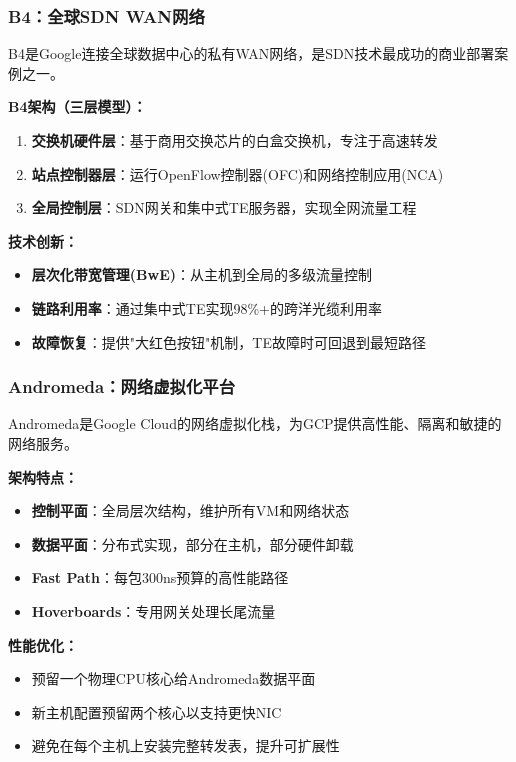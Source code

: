 \subsubsection{B4：全球SDN WAN网络}

B4是Google连接全球数据中心的私有WAN网络，是SDN技术最成功的商业部署案例之一。

\textbf{B4架构（三层模型）：}

\begin{enumerate}
    \item \textbf{交换机硬件层}：基于商用交换芯片的白盒交换机，专注于高速转发
    \item \textbf{站点控制器层}：运行OpenFlow控制器(OFC)和网络控制应用(NCA)
    \item \textbf{全局控制层}：SDN网关和集中式TE服务器，实现全网流量工程
\end{enumerate}

\textbf{技术创新：}
\begin{itemize}
    \item \textbf{层次化带宽管理(BwE)}：从主机到全局的多级流量控制
    \item \textbf{链路利用率}：通过集中式TE实现98\%+的跨洋光缆利用率
    \item \textbf{故障恢复}：提供"大红色按钮"机制，TE故障时可回退到最短路径
\end{itemize}

\subsubsection{Andromeda：网络虚拟化平台}

Andromeda是Google Cloud的网络虚拟化栈，为GCP提供高性能、隔离和敏捷的网络服务。

\textbf{架构特点：}
\begin{itemize}
    \item \textbf{控制平面}：全局层次结构，维护所有VM和网络状态
    \item \textbf{数据平面}：分布式实现，部分在主机，部分硬件卸载
    \item \textbf{Fast Path}：每包300ns预算的高性能路径
    \item \textbf{Hoverboards}：专用网关处理长尾流量
\end{itemize}

\textbf{性能优化：}
\begin{itemize}
    \item 预留一个物理CPU核心给Andromeda数据平面
    \item 新主机配置预留两个核心以支持更快NIC
    \item 避免在每个主机上安装完整转发表，提升可扩展性
\end{itemize}

